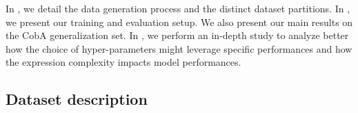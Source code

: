 


In , we detail the data generation process and the distinct dataset partitions. In , we present our training and evaluation setup. We also present our main results on the CobA generalization set. In , we perform an in-depth study to analyze better how the choice of hyper-parameters might leverage specific performances and how the expression complexity impacts model performances.



\subsection{Dataset description}




